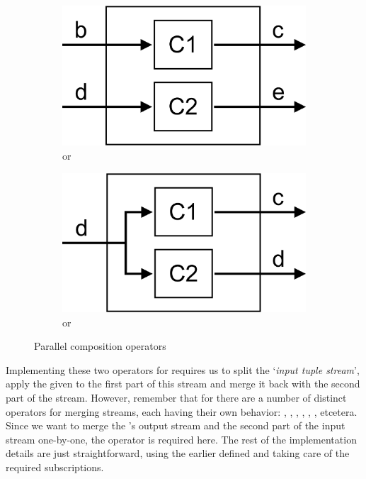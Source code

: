 \begin{figure}[H]
	\begin{subfigure}[b]{0.35\linewidth}
		\includegraphics[width=\linewidth]{figures/API-split-operator.png}
		\caption{\code{(***)} or }
		\label{fig:split-operator}
	\end{subfigure}
	\begin{subfigure}[b]{0.35\linewidth}
		\includegraphics[width=\linewidth]{figures/API-fanout-operator.png}
		\caption{\code{(\&\&\&)} or }
		\label{fig:fanout-operator}
	\end{subfigure}
	\caption{Parallel composition operators}
	\label{fig:parallel-composition}
\end{figure}

Implementing these two operators for \comp requires us to split the `\textit{input tuple stream}', apply the given \comp to the first part of this stream and merge it back with the second part of the stream. However, remember that for \obs there are a number of distinct operators for merging streams, each having their own behavior: , , , , , , etcetera. Since we want to merge the \comp's output stream and the second part of the input stream one-by-one, the  operator is required here. The rest of the implementation details are just straightforward, using the earlier defined  and taking care of the required subscriptions.

